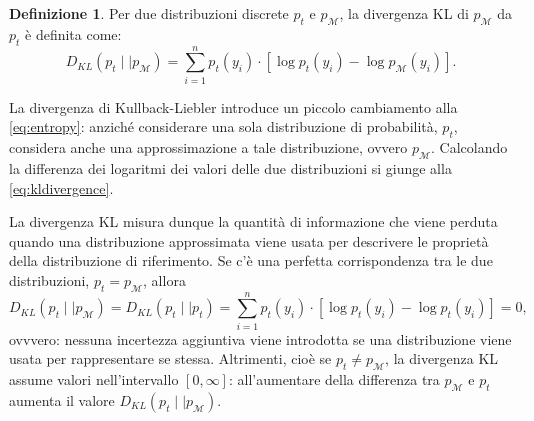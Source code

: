 \documentclass[
  10pt,
  italian,
  a4paper,
  extrafontsizes,onecolumn,openright
  ]{memoir}
\newlength{\rf}
\theoremstyle{definition}
\newtheorem{definition}{Definizione}[chapter]
\theoremstyle{definition}
\theoremstyle{definition}
\theoremstyle{definition}
\theoremstyle{remark}
\begin{document}
\begin{definition}
Per due distribuzioni discrete \(p_t\) e \(p_{\mathcal{M}}\), la divergenza KL di \(p_{\mathcal{M}}\) da \(p_t\) è definita come:
\begin{equation}
D_{KL}(p_t \mid\mid p_{\mathcal{M}}) = \sum_{i=1}^n p_t(y_i) \cdot \left[\log p_t(y_i) - \log p_{\mathcal{M}}(y_i)\right].
\label{eq:kldivergence}
\end{equation}
\end{definition}

La divergenza di Kullback-Liebler introduce un piccolo cambiamento alla \eqref{eq:entropy}: anziché considerare una sola distribuzione di probabilità, \(p_t\), considera anche una approssimazione a tale distribuzione, ovvero \(p_{\mathcal{M}}\). Calcolando la differenza dei logaritmi dei valori delle due distribuzioni si giunge alla \eqref{eq:kldivergence}.

La divergenza KL misura dunque la quantità di informazione che viene perduta quando una distribuzione approssimata viene usata per descrivere le proprietà della distribuzione di riferimento.
Se c'è una perfetta corrispondenza tra le due distribuzioni, \(p_t = p_{\mathcal{M}}\), allora
\[
D_{KL}(p_t \mid\mid p_{\mathcal{M}}) = D_{KL}(p_t \mid\mid p_t) = \sum_{i=1}^n p_t(y_i) \cdot \left[\log p_t(y_i) - \log p_t(y_i)\right] = 0,
\]
ovvvero: nessuna incertezza aggiuntiva viene introdotta se una distribuzione viene usata per rappresentare se stessa. Altrimenti, cioè se \(p_t \neq p_{\mathcal{M}}\), la divergenza KL assume valori nell'intervallo \([0, \infty]\): all'aumentare della differenza tra \(p_{\mathcal{M}}\) e \(p_t\) aumenta il valore \(D_{KL}(p_t \mid\mid p_{\mathcal{M}})\).
\end{document}
